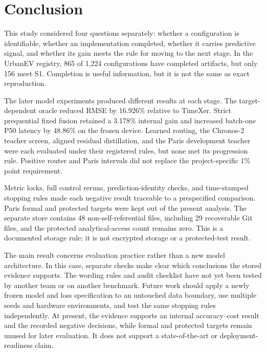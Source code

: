 \section{Conclusion}
\label{sec:conclusion}

This study considered four questions separately: whether a configuration is identifiable, whether an implementation completed, whether it carries predictive signal, and whether its gain meets the rule for moving to the next stage.  In the UrbanEV registry, 865 of 1,224 configurations have completed artifacts, but only 156 meet S1.  Completion is useful information, but it is not the same as exact reproduction.

The later model experiments produced different results at each stage.  The target-dependent oracle reduced RMSE by 16.926\% relative to TimeXer.  Strict prequential fixed fusion retained a 3.178\% internal gain and increased batch-one P50 latency by 48.86\% on the frozen device.  Learned routing, the Chronos-2 teacher screen, aligned residual distillation, and the Paris development teacher were each evaluated under their registered rules, but none met its progression rule.  Positive router and Paris intervals did not replace the project-specific 1\% point requirement.

Metric locks, full control reruns, prediction-identity checks, and time-stamped stopping rules made each negative result traceable to a prespecified comparison.  Paris formal and protected targets were kept out of the present analysis.  The separate store contains 48 non-self-referential files, including 29 recoverable Git files, and the protected analytical-access count remains zero.  This is a documented storage rule; it is not encrypted storage or a protected-test result.

The main result concerns evaluation practice rather than a new model architecture.  In this case, separate checks make clear which conclusions the stored evidence supports.  The wording rules and audit checklist have not yet been tested by another team or on another benchmark.  Future work should apply a newly frozen model and loss specification to an untouched data boundary, use multiple seeds and hardware environments, and test the same stopping rules independently.  At present, the evidence supports an internal accuracy--cost result and the recorded negative decisions, while formal and protected targets remain unused for later evaluation.  It does not support a state-of-the-art or deployment-readiness claim.
